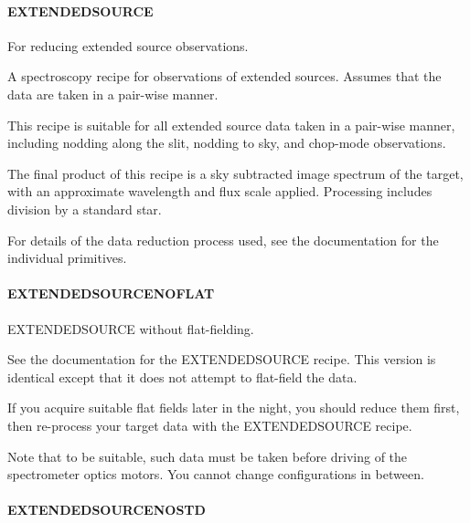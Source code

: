 \documentclass[twoside,11pt]{article}
\renewcommand{\_}{\texttt{\symbol{95}}}
\begin{document}
\paragraph{EXTENDED\_SOURCE\label{EXTENDED_SOURCE}}


For reducing extended source observations.


\mbox{}


A spectroscopy recipe for observations of extended sources.
Assumes that the data are taken in a pair-wise manner.



This recipe is suitable for all extended source data taken in a pair-wise
manner, including nodding along the slit, nodding to sky, and
chop-mode observations.



The final product of this recipe is a sky subtracted image spectrum of
the target, with an approximate wavelength and flux scale
applied. Processing includes division by a standard star.



For details of the data reduction process used, see the documentation
for the individual primitives.

\paragraph{EXTENDED\_SOURCE\_NOFLAT\label{EXTENDED_SOURCE_NOFLAT}}


EXTENDED\_SOURCE without flat-fielding.


\mbox{}


See the documentation for the EXTENDED\_SOURCE recipe. This version is
identical except that it does not attempt to flat-field the data.



If you acquire suitable flat fields later in the night, you should
reduce them first, then re-process your target data with the
EXTENDED\_SOURCE recipe.



Note that to be suitable, such data must be taken before driving
of the spectrometer optics motors. You cannot change configurations
in between.

\paragraph{EXTENDED\_SOURCE\_NOSTD\label{EXTENDED_SOURCE_NOSTD}}
\end{document}
